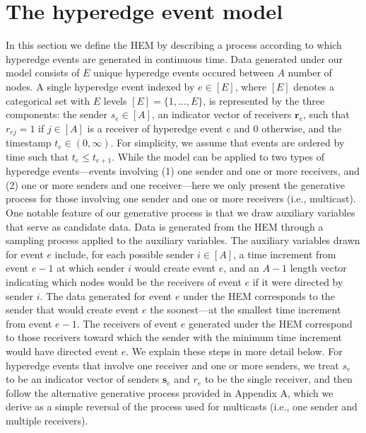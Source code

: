 \documentclass[ba]{imsart}
\numberwithin{equation}{section}
\theoremstyle{plain}
\begin{document}
	\section{The hyperedge event model}\label{sec:generative process}
	
	In this section we define the HEM by describing a process according to which hyperedge events are generated in continuous time. Data generated under our model consists of $E$ unique hyperedge events occured between $A$ number of nodes. A single hyperedge event indexed by $e \in [E]$, where $[E]$ denotes a categorical set with $E$ levels $[E] = \{1,\ldots,E\}$, is represented by the three components: the sender $s_e \in [A]$, an indicator vector of receivers $\boldsymbol{r}_e$, such that $r_{ej}=1$ if $j \in [A]$ is a receiver of hyperedge event $e$ and 0 otherwise, and the timestamp $t_e \in (0, \infty)$. For simplicity, we assume that events are ordered by time such that $t_e \leq t_{e+1}$. While the model can be applied to two types of hyperedge events---events involving (1) one sender and one or more receivers, and (2) one or more senders and one receiver---here we only present the generative process for those involving one sender and one or more receivers (i.e., multicast). One notable feature of our generative process is that we draw auxiliary variables that serve as candidate data. Data is generated from the HEM through a sampling process applied to the auxiliary variables. The auxiliary variables drawn for event $e$ include, for each possible sender $i \in [A]$, a time increment from event $e-1$ at which sender $i$ would create event $e$, and an $A-1$ length vector indicating which nodes would be the receivers of event $e$ if it were directed by sender $i$.  The data generated for event $e$ under the HEM corresponds to the sender that would create event $e$ the soonest---at the smallest time increment from event $e-1$. The receivers of event $e$ generated under the HEM correspond to those receivers toward which the sender with the minimum time increment would have directed event $e$. We explain these steps in more detail below. For hyperedge events that involve one receiver and one or more senders, we treat $s_e$ to be an indicator vector of senders $\boldsymbol{s}_e$ and $r_e$ to be the single receiver, and then follow the alternative generative process provided in Appendix A, which we derive as a simple reversal of the process used for multicasts (i.e., one sender and multiple receivers). 
	
\end{document}
